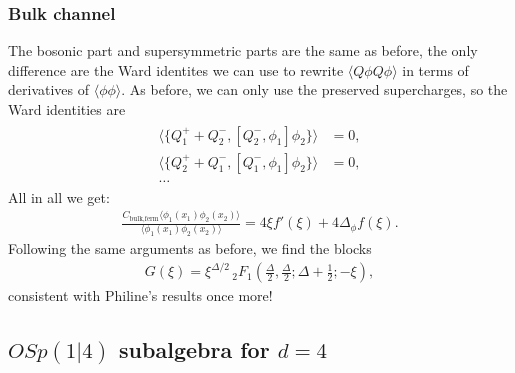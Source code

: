 \documentclass[letterpaper]{article}
\let\Oldsubsection\subsection
\renewcommand{\subsection}{\FloatBarrier\Oldsubsection}
\let\Oldsubsubsection\subsubsection
\renewcommand{\subsubsection}{\FloatBarrier\Oldsubsubsection}
\begin{document}
\subsubsection{Bulk channel}

The bosonic part and supersymmetric parts are the same as before, the only difference are the Ward identites we can use to rewrite $\langle Q\phi Q\phi \rangle$ in terms of derivatives of $\langle \phi \phi \rangle$.
As before, we can only use the preserved supercharges, so the Ward identities are
\begin{align}
\begin{split}
 \langle \{ Q^+_1 + Q^-_2, [Q^-_2, \phi_1] \phi_2 \} \rangle & = 0, \\
 \langle \{ Q^+_2 + Q^-_1, [Q^-_1, \phi_1] \phi_2 \} \rangle & = 0, \\
 \ldots
\end{split}
\end{align}
All in all we get:
\begin{align}
 \frac{C_{\text{bulk,ferm}} \langle \phi_1(x_1) \phi_2(x_2) \rangle}
      {\langle \phi_1(x_1) \phi_2(x_2) \rangle}
 = 4 \xi  f'(\xi )
 + 4 \Delta_\phi f(\xi ).
\end{align}
Following the same arguments as before, we find the blocks
\begin{align}
 G(\xi) 
 = \xi ^{\Delta /2} \, _2F_1\left(\frac{\Delta }{2},\frac{\Delta }{2};\Delta +\frac{1}{2};-\xi \right),
\end{align}
consistent with Philine's results once more!

\subsection{\texorpdfstring{$OSp(1|4)$}{OSP(1|4)} subalgebra
for \texorpdfstring{$d = 4$}{d=4}}
\end{document}
